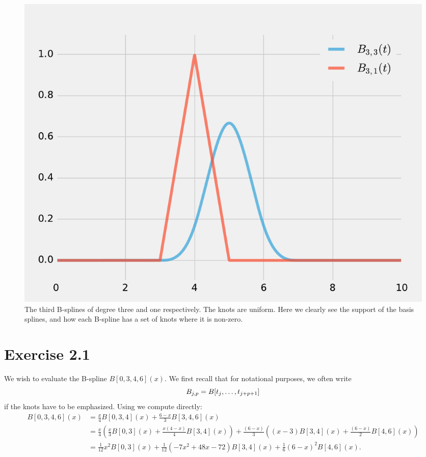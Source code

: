 \documentclass[a4paper]{article}
\begin{document}
    \begin{figure}[htpb]
        \centering
        \includegraphics[width=0.8\linewidth]{bsplines.pdf}
        \caption{The third B-splines of degree three and one respectively. The
        knots are uniform. Here we clearly see the support of the basis
    splines, and how each B-spline has a set of knots where it is non-zero.}
        \label{fig:activesplines}
    \end{figure}

    \section*{Exercise 2.1}
    \label{sec:exercise_2_1}
    
    We wish to evaluate the B-spline $B[0, 3, 4, 6](x)$. We first recall that
    for notational purposes, we often write
    \begin{equation}
        \notag
        B_{j, p} = B[t_j, \ldots, t_{j+p+1}]
    \end{equation}
    if the knots have to be emphasized. Using  we compute
    directly:
    \begin{align*}
        B[0, 3, 4, 6](x) &= \frac{x}{4}B[0, 3, 4](x) + \frac{6-x}{3}B[3, 4, 6](x) \\
                         &= \frac{x}{4}\left( \frac{x}{3} B[0, 3](x) + \frac{x(4-x)}{4}B[3, 4](x) \right)
        + \frac{(6 - x)}{3}\left((x-3)B[3, 4](x) + \frac{(6-x)}{2}B[4, 6](x) \right) \\
                          &= \frac{1}{12}x^2B[0, 3](x) + \frac{1}{12}(-7x^2 + 48x - 72)B[3, 4](x) + \frac{1}{6}(6-x)^2B[4, 6](x).
    \end{align*}
\end{document}
